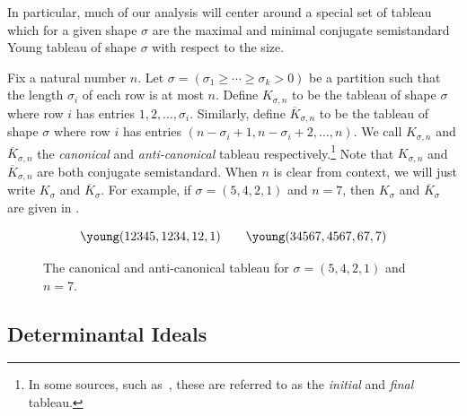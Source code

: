\documentclass[10pt,a4paper]{amsart}
\begin{document}
In particular, much of our analysis will center around a special set of tableau which for a given shape $\sigma$ are the maximal and minimal conjugate semistandard Young tableau of shape $\sigma$ with respect to the size.
\begin{defn}\label{defn:canonical_tableau}
    Fix a natural number $n$.
    Let $\sigma = (\sigma_1 \geq \cdots \geq \sigma_k > 0)$ be a partition such that the length $\sigma_i$ of each row is at most $n$.
    Define $K_{\sigma, n}$ to be the tableau of shape $\sigma$ where row $i$ has entries $1, 2, \ldots, \sigma_i$.
    Similarly, define $\overline{K}_{\sigma, n}$ to be the tableau of shape $\sigma$ where row $i$ has entries $(n - \sigma_i + 1, n - \sigma_i + 2, \ldots, n)$.
    We call $K_{\sigma, n}$ and $\overline{K}_{\sigma, n}$ the \emph{canonical} and \emph{anti-canonical} tableau respectively.\footnote{In some sources, such as~\cite{BV88}, these are referred to as the \emph{initial} and \emph{final} tableau.}
    Note that $K_{\sigma, n}$ and $\overline{K}_{\sigma, n}$ are both conjugate semistandard.
    When $n$ is clear from context, we will just write $K_{\sigma}$ and $\overline{K}_{\sigma}$.
    For example, if $\sigma = (5, 4, 2, 1)$ and $n = 7$, then $K_\sigma$ and $\overline{K}_\sigma$ are given in .
    
    \begin{figure}[H]
        \centering
        \[
            \young(12345,1234,12,1) \qquad \young(34567,4567,67,7)
        \]
        \caption{
          The canonical and anti-canonical tableau for $\sigma = (5, 4, 2, 1)$ and $n = 7$.
        }\label{fig:canonical_tableau_ex}
    \end{figure}
\end{defn}

\subsection{Determinantal Ideals}
\end{document}
